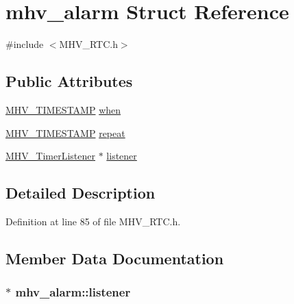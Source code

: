 \hypertarget{structmhv__alarm}{
\section{mhv\-\_\-alarm \-Struct \-Reference}
\label{structmhv__alarm}
}


{\ttfamily \#include $<$\-M\-H\-V\-\_\-\-R\-T\-C.\-h$>$}

\subsection*{\-Public \-Attributes}
\begin{DoxyCompactItemize}
\item 
\hyperlink{_m_h_v___r_t_c_8h_a1e30d3a92b1b868286bd0d619245d8a6}{\-M\-H\-V\-\_\-\-T\-I\-M\-E\-S\-T\-A\-M\-P} \hyperlink{structmhv__alarm_acbab8b3b4efa4d891d598cbd5b47fb7c}{when}
\item 
\hyperlink{_m_h_v___r_t_c_8h_a1e30d3a92b1b868286bd0d619245d8a6}{\-M\-H\-V\-\_\-\-T\-I\-M\-E\-S\-T\-A\-M\-P} \hyperlink{structmhv__alarm_ad8195c11cd5d6ff3bb37d01185c04af2}{repeat}
\item 
\hyperlink{class_m_h_v___timer_listener}{\-M\-H\-V\-\_\-\-Timer\-Listener} $\ast$ \hyperlink{structmhv__alarm_a8293d729772996c869be76184bfc09e8}{listener}
\end{DoxyCompactItemize}


\subsection{\-Detailed \-Description}


\-Definition at line 85 of file \-M\-H\-V\-\_\-\-R\-T\-C.\-h.



\subsection{\-Member \-Data \-Documentation}
\hypertarget{structmhv__alarm_a8293d729772996c869be76184bfc09e8}{
\subsubsection[{listener}]{$\ast$ {\bf mhv\-\_\-alarm\-::listener}}}
\label{structmhv__alarm_a8293d729772996c869be76184bfc09e8}


